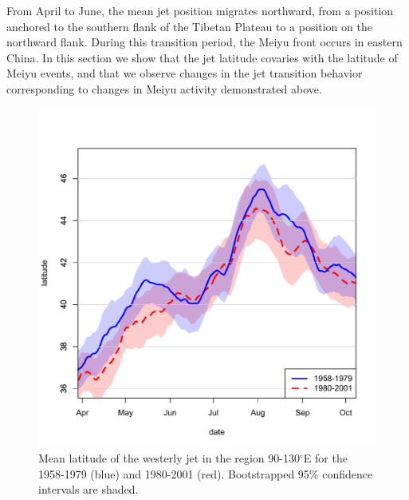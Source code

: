 \documentclass[draft,grl]{AGUTeX}
\begin{document}
\begin{article}
	


From April to June, the mean jet position migrates northward, from a position anchored to the southern flank of the Tibetan Plateau to a position on the northward flank. During this transition period, the Meiyu front occurs in eastern China. In this section we show that the jet latitude covaries with the latitude of Meiyu events, and that we observe changes in the jet transition behavior corresponding to changes in Meiyu activity demonstrated above. 

\begin{figure}[htbp]
\begin{center}
\includegraphics[width=5in]{Figures/jet_seasonal.pdf}
\caption{Mean latitude of the westerly jet in the region 90-130$^\circ$E for the 1958-1979 (blue) and 1980-2001 (red). Bootstrapped 95\% confidence intervals are shaded. }
\label{jet_seasonal}
\end{center}
\end{figure}


\end{article}
\end{document}
